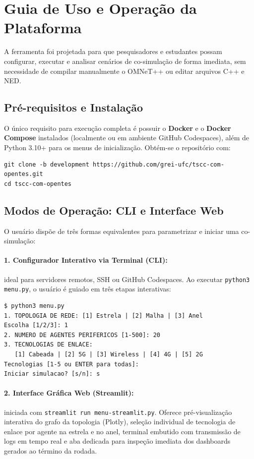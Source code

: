 \documentclass[10pt,twocolumn,a4paper]{article}
\begin{document}
\section{Guia de Uso e Operação da Plataforma}

A ferramenta foi projetada para que pesquisadores e estudantes possam configurar, executar e analisar cenários de co-simulação de forma imediata, sem necessidade de compilar manualmente o OMNeT++ ou editar arquivos C++ e NED.

\subsection{Pré-requisitos e Instalação}

O único requisito para execução completa é possuir o \textbf{Docker} e o \textbf{Docker Compose} instalados (localmente ou em ambiente GitHub Codespaces), além de Python 3.10+ para os menus de inicialização. Obtém-se o repositório com:

\begin{lstlisting}[style=shellstyle]
git clone -b development https://github.com/grei-ufc/tscc-com-opentes.git
cd tscc-com-opentes
\end{lstlisting}

\subsection{Modos de Operação: CLI e Interface Web}

O usuário dispõe de três formas equivalentes para parametrizar e iniciar uma co-simulação:

\paragraph{1. Configurador Interativo via Terminal (CLI):} ideal para servidores remotos, SSH ou GitHub Codespaces. Ao executar \texttt{python3 menu.py}, o usuário é guiado em três etapas interativas:
\begin{lstlisting}[style=shellstyle]
$ python3 menu.py
1. TOPOLOGIA DE REDE: [1] Estrela | [2] Malha | [3] Anel
Escolha [1/2/3]: 1
2. NUMERO DE AGENTES PERIFERICOS [1-500]: 20
3. TECNOLOGIAS DE ENLACE:
   [1] Cabeada | [2] 5G | [3] Wireless | [4] 4G | [5] 2G
Tecnologias [1-5 ou ENTER para todas]:
Iniciar simulacao? [s/n]: s
\end{lstlisting}

\paragraph{2. Interface Gráfica Web (Streamlit):} iniciada com \texttt{streamlit run menu-streamlit.py}. Oferece pré-visualização interativa do grafo da topologia (Plotly), seleção individual de tecnologia de enlace por agente na estrela e no anel, terminal embutido com transmissão de logs em tempo real e aba dedicada para inspeção imediata dos dashboards gerados ao término da rodada.
\end{document}
